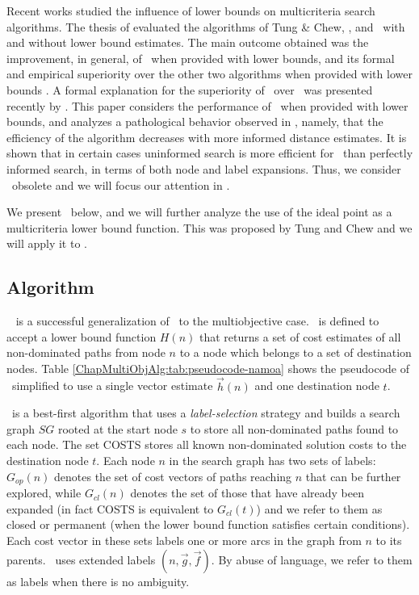 Recent works studied the influence of lower bounds on multicriteria search algorithms. The thesis of \citet{Machuca2012a} evaluated the algorithms of Tung \& Chew, \moa, and \namoa \ with and without lower bound estimates. The main outcome obtained was the improvement, in general, of \namoa \ when provided with lower bounds, and its formal and empirical superiority over the other two algorithms when provided with lower bounds  \citep[2.4.3]{Machuca2012a}. A formal explanation for the superiority of \namoa \ over \moa \ was presented recently by \citet{PerezdelaCruz2013}. This paper considers the performance of \moa \ when provided with lower bounds, and analyzes a pathological behavior observed in \moa, namely, that the efficiency of the algorithm decreases with more informed distance estimates. It is shown that in certain cases uninformed search is more efficient for \moa \ than perfectly informed search, in terms of both node and label expansions. Thus, we consider \moa \ obsolete and we will focus our attention in \namoa.

We present \namoa \ below, and we will further analyze the use of the ideal point as a multicriteria lower bound function. This was proposed by Tung and Chew and we will apply it to \namoa.

\subsection{Algorithm \texorpdfstring{\namoa}{NAMOA*}}
\label{chapMultiObjAlg:subsec:namoa}

\namoa \ \citep{Mandow2005,Mandow2010} is a successful generalization of \astar \ to the multiobjective case. \namoa \ is defined to accept a lower bound function $H(n)$ that returns a set of cost estimates of all non-dominated paths from node $n$ to a node which belongs to a set of destination nodes. Table \ref{ChapMultiObjAlg:tab:pseudocode-namoa} shows the pseudocode of \namoa \ simplified to use a single vector estimate $\vec h(n)$ and one destination node $t$. 

\namoa \ is a best-first algorithm that uses a \textit{label-selection} strategy and builds a search graph $SG$ rooted at the start node $s$ to store all non-dominated paths found to each node. The set COSTS stores all known non-dominated solution costs to the destination node $t$. Each node $n$ in the search graph has two sets of labels: $G_{op}(n)$ denotes the set of cost vectors of paths reaching $n$ that can be further explored, while $G_{cl}(n)$ denotes the set of those that have already been expanded (in fact COSTS is equivalent to $G_{cl}(t)$) and we refer to them as closed or permanent (when the lower bound function satisfies certain conditions). Each cost vector in these sets labels one or more arcs in the graph from $n$ to its parents. \namoa \ uses extended labels $(n, \vec g, \vec f)$. By abuse of language, we refer to them as labels when there is no ambiguity. 

